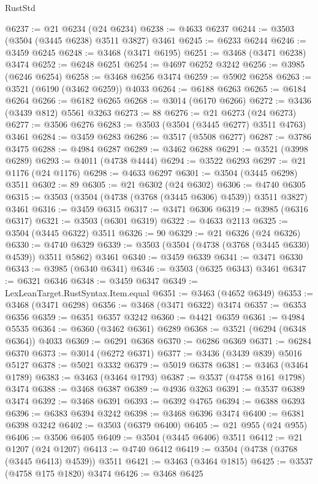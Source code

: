 \begin{lexlean}{RustStd}
\begin{coremodule}
@6237 := @21 @6234 (@24 @6234)
@6238 := @4633 @6237
@6244 := @3503 (@3504 (@3445 @6238) @3511 @3827) @3461
@6245 := @6233 @6244
@6246 := @3459 @6245
@6248 := @3468 (@3471 @6195)
@6251 := @3468 (@3471 @6238) @3474
@6252 := @6248 @6251
@6254 := @4697 @6252 @3242
@6256 := @3985 (@6246 @6254)
@6258 := @3468 @6256 @3474
@6259 := @5902 @6258
@6263 := @3521 (@6190 (@3462 @6259)) @4033
@6264 := @6188 @6263
@6265 := @6184 @6264
@6266 := @6182 @6265
@6268 := @3014 (@6170 @6266)
@6272 := @3436 (@3439 @812) @5561 @3263
@6273 := 88
@6276 := @21 @6273 (@24 @6273)
@6277 := @3506 @6276
@6283 := @3503 (@3504 (@3445 @6277) @3511 @4763) @3461
@6284 := @3459 @6283
@6286 := @3517 (@5508 @6277)
@6287 := @3786 @3475
@6288 := @4984 @6287
@6289 := @3462 @6288
@6291 := @3521 (@3998 @6289)
@6293 := @4011 (@4738 @4444)
@6294 := @3522 @6293
@6297 := @21 @1176 (@24 @1176)
@6298 := @4633 @6297
@6301 := @3504 (@3445 @6298) @3511
@6302 := 89
@6305 := @21 @6302 (@24 @6302)
@6306 := @4740 @6305
@6315 := @3503 (@3504 (@4738 (@3768 (@3445 @6306) @4539)) @3511 @3827) @3461
@6316 := @3459 @6315
@6317 := @3471 @6306
@6319 := @3985 (@6316 @6317)
@6321 := @3503 (@6301 @6319)
@6322 := @4633 @2113
@6325 := @3504 (@3445 @6322) @3511
@6326 := 90
@6329 := @21 @6326 (@24 @6326)
@6330 := @4740 @6329
@6339 := @3503 (@3504 (@4738 (@3768 (@3445 @6330) @4539)) @3511 @5862) @3461
@6340 := @3459 @6339
@6341 := @3471 @6330
@6343 := @3985 (@6340 @6341)
@6346 := @3503 (@6325 @6343) @3461
@6347 := @6321 @6346
@6348 := @3459 @6347
@6349 := LexLeanTarget.RustSyntax.Item.equal
@6351 := @3463 (@4652 @6349)
@6353 := @3468 (@3471 @6298)
@6356 := @3468 (@3471 @6322) @3474
@6357 := @6353 @6356
@6359 := @6351 @6357 @3242
@6360 := @4421 @6359
@6361 := @4984 @5535
@6364 := @6360 (@3462 @6361) @6289
@6368 := @3521 (@6294 (@6348 @6364)) @4033
@6369 := @6291 @6368
@6370 := @6286 @6369
@6371 := @6284 @6370
@6373 := @3014 (@6272 @6371)
@6377 := @3436 (@3439 @839) @5016 @5127
@6378 := @5021 @3332
@6379 := @5019 @6378
@6381 := @3463 (@3464 @1789)
@6383 := @3463 (@3464 @1793)
@6387 := @3537 (@4758 @161 @1798) @3474
@6388 := @3468 @6387
@6389 := @4936 @3263
@6391 := @3537 @6389 @3474
@6392 := @3468 @6391
@6393 := @6392 @4765
@6394 := @6388 @6393
@6396 := @6383 @6394 @3242
@6398 := @3468 @6396 @3474
@6400 := @6381 @6398 @3242
@6402 := @3503 (@6379 @6400)
@6405 := @21 @955 (@24 @955)
@6406 := @3506 @6405
@6409 := @3504 (@3445 @6406) @3511
@6412 := @21 @1207 (@24 @1207)
@6413 := @4740 @6412
@6419 := @3504 (@4738 (@3768 (@3445 @6413) @4539)) @3511
@6421 := @3463 (@3464 @1815)
@6425 := @3537 (@4758 @175 @1820) @3474
@6426 := @3468 @6425

\end{coremodule}
\end{lexlean}
